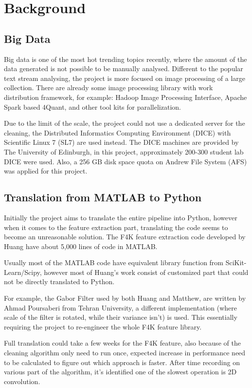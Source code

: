 \documentclass[bsc,logo,twoside,fullspacing,parskip]{infthesis}
\begin{document}
\chapter{Background}

\section{Big Data}

Big data is one of the most hot trending topics recently, where the amount of the data generated is not possible to be manually analysed. 
Different to the popular text stream analysing, the project is more focused on image processing of a large collection. 
There are already some image processing library with work distribution framework, for example: Hadoop Image Processing Interface\cite{L3}, Apache Spark based 4Quant\cite{L4}, and other tool kits for parallelization.

Due to the limit of the scale, the project could not use a dedicated server for the cleaning, the Distributed Informatics Computing Environment (DICE) with Scientific Linux 7 (SL7) are used instead. 
The DICE machines are provided by The University of Edinburgh, in this project, approximately 200-300 student lab DICE were used.
Also, a 256 GB disk space quota on Andrew File System (AFS) was applied for this project.

\section{Translation from MATLAB to Python}
\label{sec:translate}

Initially the project aims to translate the entire pipeline into Python, however when it comes to the feature extraction part, translating the code seems to become an unreasonable solution.
The F4K feature extraction code developed by Huang have about 5,000 lines of code in MATLAB.

Usually most of the MATLAB code have equivalent library function from SciKit-Learn/Scipy, however most of Huang's work consist of customized part that could not be directly translated to Python.

For example, the Gabor Filter used by both Huang and Matthew, are written by Ahmad Poursaberi from Tehran University, a different implementation (where scale of the filter is rotated, while their variance isn't) is used. This essentially requiring the project to re-engineer the whole F4K feature library.

Full translation could take a few weeks for the F4K feature, also because of the cleaning algorithm only need to run once, expected increase in performance need to be calculated to figure out which approach is faster. After time recording on various part of the algorithm, it's identified one of the slowest operation is 2D convolution.
\end{document}
